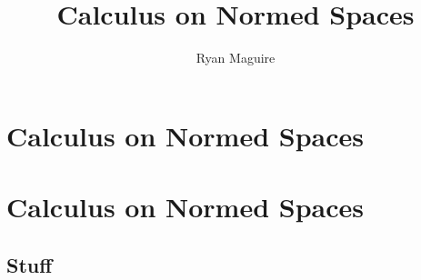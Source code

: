 \documentclass[crop=false,class=book,oneside]{standalone}
\begin{document}
    \ifx\ifmathcourses\undefined
        \title{Calculus on Normed Spaces}
        \author{Ryan Maguire}
        \date{\vspace{-5ex}}
        \maketitle
        \tableofcontents
        \clearpage
        \chapter*{Calculus on Normed Spaces}
        \vspace{10ex}
        \setcounter{chapter}{1}
    \else
        \chapter{Calculus on Normed Spaces}
    \fi
    \section{Stuff}
\end{document}

